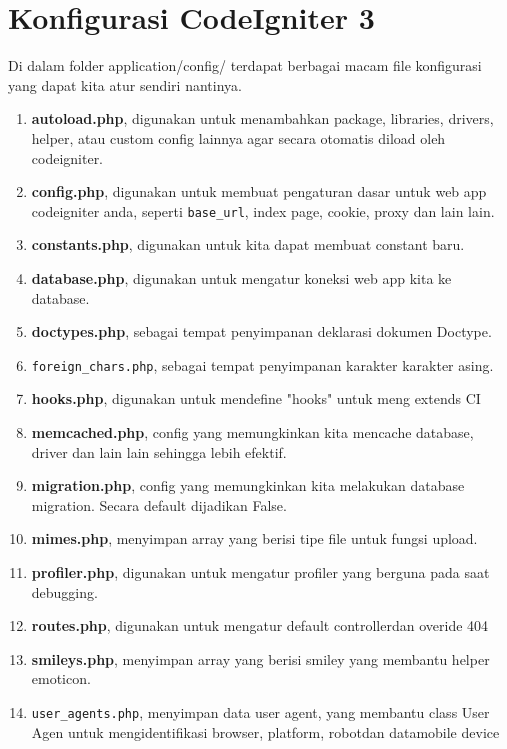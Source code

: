 \section{Konfigurasi CodeIgniter 3}
Di dalam folder application/config/ terdapat berbagai macam file konfigurasi yang dapat kita atur sendiri nantinya.
\begin{enumerate}
    \item \textbf{autoload.php}, digunakan untuk menambahkan package, libraries, drivers, helper, atau custom config lainnya agar secara otomatis diload oleh codeigniter.
    \item \textbf{config.php}, digunakan untuk membuat pengaturan dasar untuk web app codeigniter anda, seperti \verb|base_url|, index page, cookie, proxy dan lain lain.
    \item \textbf{constants.php}, digunakan untuk kita dapat membuat constant baru.
    \item \textbf{database.php}, digunakan untuk mengatur koneksi web app kita ke database.
    \item \textbf{doctypes.php}, sebagai tempat penyimpanan deklarasi dokumen Doctype.
    \item \verb|foreign_chars.php|, sebagai tempat penyimpanan karakter karakter asing.
    \item \textbf{hooks.php}, digunakan untuk mendefine "hooks" untuk meng extends CI
    \item \textbf{memcached.php}, config yang memungkinkan kita mencache database, driver dan lain lain sehingga lebih efektif.
    \item \textbf{migration.php}, config yang memungkinkan kita melakukan database migration. Secara default dijadikan False.
    \item \textbf{mimes.php}, menyimpan array yang berisi tipe file untuk fungsi upload.
    \item \textbf{profiler.php}, digunakan untuk mengatur profiler yang berguna pada saat debugging.
    \item \textbf{routes.php}, digunakan untuk mengatur default controllerdan overide 404
    \item \textbf{smileys.php}, menyimpan array yang berisi smiley yang membantu helper emoticon.
    \item \verb|user_agents.php|, menyimpan data user agent, yang membantu class User Agen untuk mengidentifikasi browser, platform, robotdan datamobile device
\end{enumerate}

